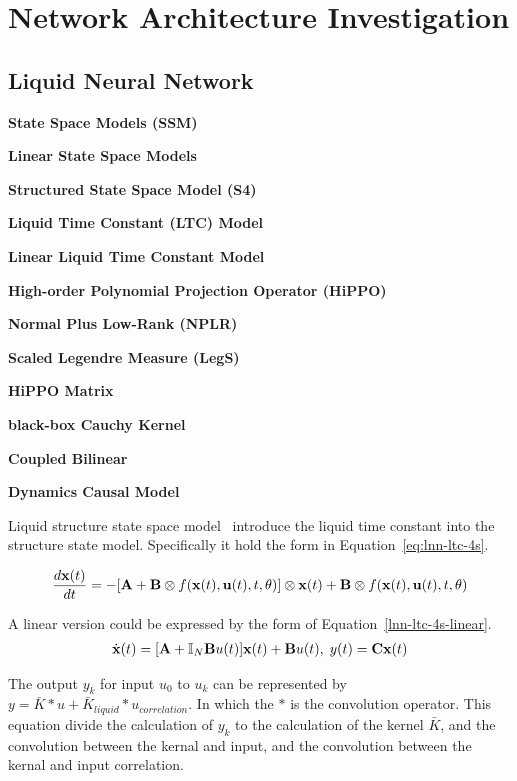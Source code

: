 
\chapter{Network Architecture Investigation}
\section{Liquid Neural Network}
\textbf{State Space Models (SSM)}

\textbf{Linear State Space Models}

\textbf{Structured State Space Model (S4)~\cite{lnn-s4}}

\textbf{Liquid Time Constant (LTC) Model~\cite{ltc}}

\textbf{Linear Liquid Time Constant Model}


\textbf{High-order Polynomial Projection Operator (HiPPO)}

\textbf{Normal Plus Low-Rank (NPLR)}

\textbf{Scaled Legendre Measure (LegS)}

\textbf{HiPPO Matrix}

\textbf{black-box Cauchy Kernel}

\textbf{Coupled Bilinear}

\textbf{Dynamics Causal Model}


Liquid structure state space model~\cite{lnn-4s} introduce the liquid time constant into the 
structure state model. Specifically it hold the form in Equation~\ref{eq:lnn-ltc-4s}.

\begin{equation}\label{eq:lnn-ltc-4s}
\frac{d\bold {x}(t)}{dt} = -[\bold {A} + \bold {B} \otimes f(\bold {x}(t), \bold {u}(t), t, \theta)]\otimes \bold {x}(t) + \bold {B}
\otimes f(\bold {x}(t), \bold {u}(t), t, \theta)
\end{equation}

A linear version could be expressed by the form of Equation~\ref{lnn-ltc-4s-linear}.
\begin{align}\label{lnn-ltc-4s-linear}
    \dot{\bold {x}}(t) = [\bold {A} + \mathbb {I}_N \bold {B} u(t)] \bold x(t) + \bold {B} u(t),\; y(t) = \bold {C} \bold x(t)
\end{align}

The output $y_k$ for input $u_0$ to $u_k$ can be represented by $y=\bar K * u + \bar K_{liquid} * u_{correlation}$.
In which the $*$ is the convolution operator. This equation divide the calculation of $y_k$ to the calculation of the 
kernel $\bar K$, and the convolution between the kernal and input, and the convolution between the kernal and input
 correlation.




